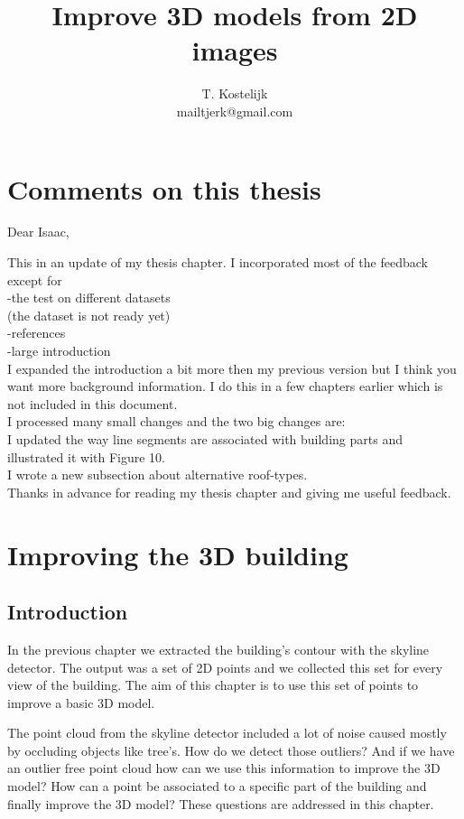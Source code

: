 \documentclass[10pt]{article}
\title{\sc Improve 3D models from 2D images}
\author{T. Kostelijk\\mailtjerk@gmail.com}
\begin{document}
\maketitle




\section{Comments on this thesis}
Dear Isaac,

This in an update of my thesis chapter. I incorporated most of the feedback except for\\
-the test on different datasets\\
(the dataset is not ready yet)\\
-references\\
-large introduction\\
I expanded the introduction a bit more then my previous version but I think you want more background
information. I do this in a few chapters earlier which is not included in this document.\\
I processed many small changes and the two big changes are:\\
I updated the way line segments are associated with building parts and illustrated it with Figure 10.\\
I wrote a new subsection about alternative roof-types.\\
Thanks in advance for reading my thesis chapter and giving me useful feedback.

 
\section{Improving the 3D building}
\subsection{Introduction}
In the previous chapter we extracted the building's contour with the skyline
detector. The output was a set of 2D points and we collected this set for every
view of the building.  The aim of this chapter is to use this set of points to
improve a basic 3D model. 

The point cloud from the skyline detector included a lot of noise caused mostly
by occluding objects like tree's. How do we detect those outliers?
And if we have an outlier free point cloud how can we use this information to
improve the 3D model? How can a point be associated to a specific part of the
building and finally improve the 3D model? 
These questions are addressed in this chapter.
\end{document}
